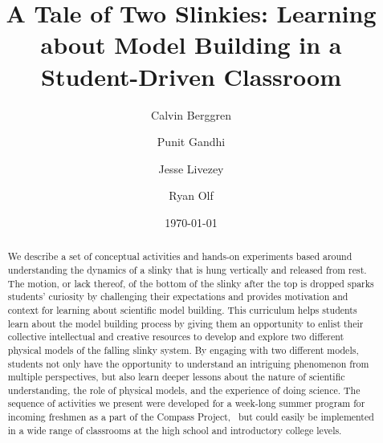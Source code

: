 \documentclass[prb,preprint,superscriptaddress]{revtex4-1}
\begin{document}
\title{A Tale of Two Slinkies: Learning about Model Building in a Student-Driven Classroom}
\author{Calvin Berggren}
\author{Punit  Gandhi}
\author{Jesse Livezey}
\author{Ryan Olf}
\date{\today}

\begin{abstract}

We describe a set of conceptual activities and hands-on experiments based around understanding the dynamics of a slinky that is hung vertically and released from rest.
The motion, or lack thereof, of the bottom of the slinky after the top is dropped sparks students' curiosity by challenging  their expectations and provides motivation and context for learning about scientific model building.
This curriculum helps students learn about the model building process by giving them an opportunity to enlist their collective intellectual and creative resources to develop and explore two different physical models of the falling slinky system. By engaging with two different models, students not only have the opportunity to understand an intriguing phenomenon from multiple perspectives, but also learn deeper lessons about the nature of scientific understanding, the role of physical models, and the experience of doing science. 
The sequence of activities we present were developed for a week-long summer program for incoming freshmen as a part of the Compass Project,~\cite{albana2013} but could easily be implemented in a wide range of classrooms at the high school and introductory college levels.
\end{abstract}
\end{document}
